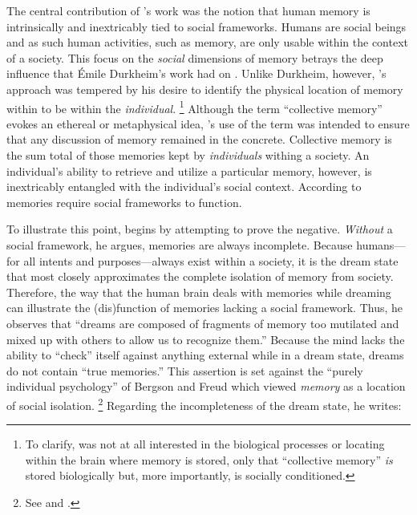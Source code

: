 The central contribution of \halbwachs's work was the notion that human memory is intrinsically and inextricably tied to social frameworks.\autocite[37--38]{halbwachs1992} Humans are social beings and as such human activities, such as memory, are only usable within the context of a society. This focus on the \emph{social} dimensions of memory betrays the deep influence that Émile Durkheim's work had on \halbwachs.\autocite[8--9]{coser_halbwachs1992} Unlike Durkheim, however, \halbwachs's approach was tempered by his desire to identify the physical location of memory within to be within the \emph{individual}.%
%
\footnote{To clarify, \halbwachs was not at all interested in the biological processes or locating within the brain where memory is stored, only that ``collective memory'' \emph{is} stored biologically but, more importantly, is socially conditioned.}
%
Although the term ``collective memory'' evokes an ethereal or metaphysical idea, \halbwachs's use of the term was intended to ensure that any discussion of memory remained in the concrete. Collective memory is the sum total of those memories kept by \emph{individuals} withing a society. An individual's ability to retrieve and utilize a particular memory, however, is inextricably entangled with the individual's social context. According to \halbwachs memories require social frameworks to function.\autocite[38]{halbwachs1992}  

To illustrate this point, \halbwachs begins  by attempting to prove the negative. \emph{Without} a social framework, he argues, memories are always incomplete. Because humans---for all intents and purposes---always exist within a society, it is the dream state that most closely approximates the complete isolation of memory from society.\autocite[41--42]{halbwachs1992} Therefore, the way that the human brain deals with memories while dreaming can illustrate the (dis)function of memories lacking a social framework. Thus, he observes that ``dreams are composed of fragments of memory too mutilated and mixed up with others to allow us to recognize them.''\autocite[41]{halbwachs1992} Because the mind lacks the ability to ``check'' itself against anything external while in a dream state, dreams do not contain ``true memories.''\autocite[41]{halbwachs1992} This assertion is set against the ``purely individual psychology'' of Bergson and Freud which viewed \emph{memory} as a location of social isolation.%
%
\footnote{See \cite{ansellpearson_radstone-schwarz2011} and \cite{terdiman_radstone-schwarz2011}.}
%
Regarding the incompleteness of the dream state, he writes:  

